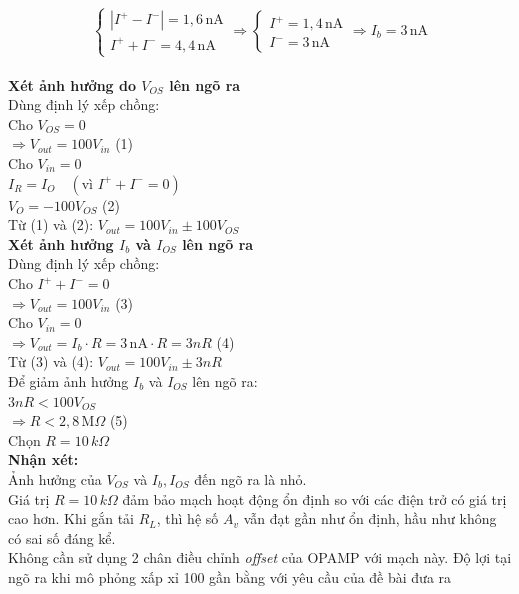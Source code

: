 \begin{flushleft}
\[
\begin{cases}
|I^+ - I^-| = 1{,}6\,\text{nA}\\
I^+ + I^- = 4{,}4\,\text{nA}
\end{cases}
\Rightarrow
\begin{cases}
I^+ = 1{,}4\,\text{nA}\\
I^- = 3\,\text{nA}
\end{cases}
\Rightarrow I_b = 3\,\text{nA}
\]\\[8pt]

\textbf{Xét ảnh hưởng do $V_{OS}$ lên ngõ ra}\\
Dùng định lý xếp chồng:\\[4pt]
Cho $V_{OS} = 0$\\[4pt]
$\Rightarrow V_{out} = 100V_{in}$ \hfill (1)\\[6pt]
Cho $V_{in} = 0$\\[4pt]
$I_R = I_O \quad (\text{vì } I^+ + I^- = 0)$\\[4pt]
$V_O = -100V_{OS}$ \hfill (2)\\[6pt]
Từ (1) và (2): $V_{out} = 100V_{in} \pm 100V_{OS}$\\[10pt]

\textbf{Xét ảnh hưởng $I_b$ và $I_{OS}$ lên ngõ ra}\\
Dùng định lý xếp chồng:\\[4pt]
Cho $I^+ + I^- = 0$\\[4pt]
$\Rightarrow V_{out} = 100V_{in}$ \hfill (3)\\[6pt]
Cho $V_{in} = 0$\\[4pt]
$\Rightarrow V_{out} = I_b \cdot R = 3\,\text{nA} \cdot R = 3nR$ \hfill (4)\\[6pt]
Từ (3) và (4): $V_{out} = 100V_{in} \pm 3nR$\\[8pt]

Để giảm ảnh hưởng $I_b$ và $I_{OS}$ lên ngõ ra:\\[4pt]
$3nR < 100V_{OS}$\\[4pt]
$\Rightarrow R < 2{,}8\,\text{M}\Omega$ \hfill (5)\\[4pt]
Chọn $R = 10\,k\Omega$\\[10pt]

\textbf{Nhận xét:}\\[4pt]
Ảnh hưởng của $V_{OS}$ và $I_b, I_{OS}$ đến ngõ ra là nhỏ.\\
Giá trị $R = 10\,k\Omega$ đảm bảo mạch hoạt động ổn định so với các điện trở có giá trị cao hơn.
Khi gắn tải $R_L$, thì hệ số $A_v$ vẫn đạt gần như ổn định, hầu như không có sai số đáng kể.\\[4pt]
Không cần sử dụng 2 chân điều chỉnh \textit{offset} của OPAMP với mạch này.
Độ lợi tại ngõ ra khi mô phỏng xấp xỉ 100 gần bằng với yêu cầu của đề bài đưa ra
\end{flushleft}

